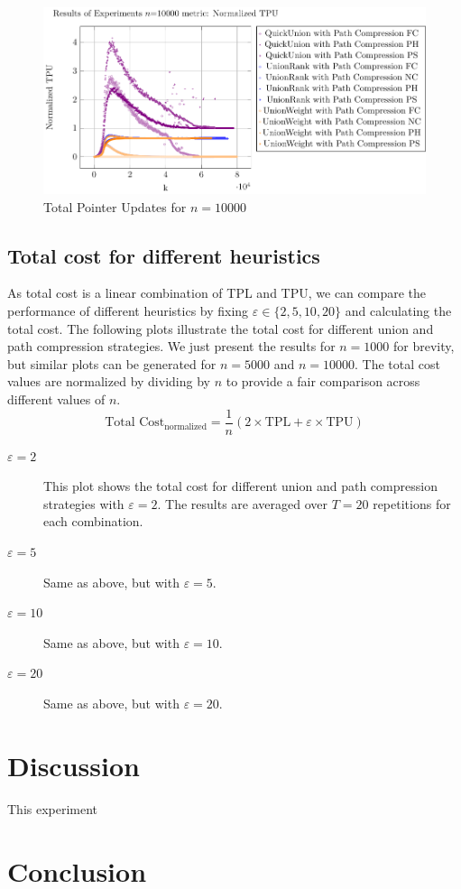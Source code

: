 \documentclass[10pt,a4paper,hidelinks]{article}
\begin{document}
\begin{description}
    \begin{figure}[h]
        \centering
        \includegraphics[width=\linewidth]{plots/plot_10000_Normalized TPU.pdf}
        \caption{Total Pointer Updates for $n = 10000$}
    \end{figure}
\end{description}

\subsection{Total cost for different heuristics}
As total cost is a linear combination of TPL and TPU, we can compare the performance of different heuristics by fixing $\varepsilon \in \{2, 5, 10, 20\}$ and calculating the total cost. The following plots illustrate the total cost for different union and path compression strategies. We just present the results for $n = 1000$ for brevity, but similar plots can be generated for $n = 5000$ and $n = 10000$. The total cost values are normalized by dividing by $n$ to provide a fair comparison across different values of $n$.
$$\boxed{\text{Total Cost}_{\text{normalized}} = \dfrac{1}{n}\left(2\times\text{TPL} + \varepsilon \times \text{TPU}\right)}$$
\begin{description}
    \item[$\varepsilon = 2$] This plot shows the total cost for different union and path compression strategies with $\varepsilon = 2$. The results are averaged over $T=20$ repetitions for each combination.
    \item[$\varepsilon = 5$] Same as above, but with $\varepsilon = 5$.
    \item[$\varepsilon = 10$] Same as above, but with $\varepsilon = 10$.
    \item[$\varepsilon = 20$] Same as above, but with $\varepsilon = 20$.
\end{description}

\section{Discussion}
This experiment
\section{Conclusion}


\newpage
\listoffigures
\lstlistoflistings
\listoftables
\end{document}
